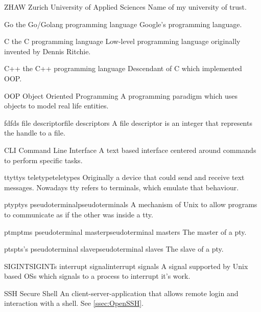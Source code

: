 
%
{ZHAW}{}%
{Zurich University of Applied Sciences}{}%
{Name of my university of trust.}

%
{Go}{}%
{the Go/Golang programming language}{}%
{Google's programming language.}

%
{C}{}%
{the C programming language}{}%
{Low-level programming language originally invented by Dennis Ritchie.}

%
{C++}{}%
{the C++ programming language}{}%
{Descendant of \gls{C} which implemented \gls{OOP}.}

%
{OOP}{}%
{Object Oriented Programming}{}%
{A programming paradigm which uses objects to model real life entities.}

%
{fd}{fds}%
{file descriptor}{file descriptors}%
{A file descriptor is an integer that represents the handle to a file.}

%
{CLI}{}%
{Command Line Interface}{}%
{A text based interface centered around commands to perform specific tasks.}

%
{tty}{ttys}%
{teletype}{teletypes}%
{Originally a device that could send and receive text messages. Nowadays \gls{tty} refers to \glspl{terminal}, which emulate that behaviour.}

%
{pty}{ptys}%
{pseudoterminal}{pseudoterminals}%
{A mechanism of \gls{Unix} to allow programs to communicate as if the other was inside a \gls{tty}.}

%
{ptm}{ptms}%
{pseudoterminal master}{pseudoterminal masters}%
{The master of a \gls{pty}.}

%
{pts}{pts's}%
{pseudoterminal slave}{pseudoterminal slaves}%
{The slave of a \gls{pty}.}

%
{SIGINT}{SIGINTs}%
{interrupt signal}{interrupt signals}%
{A signal supported by \gls{Unix} based \glspl{OS} which signals to a process to interrupt it's work.}

%
{SSH}{}%
{Secure Shell}{}%
{An client-server-application that allows remote login and interaction with a \gls{shell}. See \ref{ssec:OpenSSH}.}

